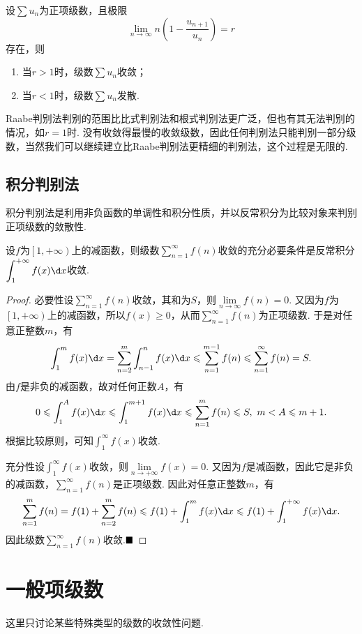 \begin{corollary}[Raabe判别法的极限形式]
	设$\sum u_n$为正项级数，且极限
	$$\lim\limits_{n\to\infty}n\left(1-\frac{u_{n+1}}{u_n}\right)=r$$
	存在，则
	\begin{enumerate}
		\item 当$r>1$时，级数$\sum u_n$收敛；
		\item 当$r<1$时，级数$\sum u_n$发散.
	\end{enumerate}
\end{corollary}
Raabe判别法判别的范围比比式判别法和根式判别法更广泛，但也有其无法判别的情况，如$r=1$时. 没有收敛得最慢的收敛级数，因此任何判别法只能判别一部分级数，当然我们可以继续建立比Raabe判别法更精细的判别法，这个过程是无限的.
\subsection{积分判别法}
积分判别法是利用非负函数的单调性和积分性质，并以反常积分为比较对象来判别正项级数的敛散性.
\begin{theorem}
	设$f$为$\left[1,+\infty\right)$上的减函数，则级数$\displaystyle\sum_{n=1}^{\infty}f(n)$收敛的充分必要条件是反常积分$\displaystyle\int_{1}^{+\infty}f(x)\d x$收敛.
\end{theorem}
\begin{proof}
	{\heiti 必要性}\quad 设$\displaystyle\sum_{n=1}^{\infty}f(n)$收敛，其和为$S$，则$\lim\limits_{n\to\infty}f(n)=0$. 又因为$f$为$\left[1,+\infty\right)$上的减函数，所以$f(x)\geqslant 0$，从而$\displaystyle\sum_{n=1}^{\infty}f(n)$为正项级数. 于是对任意正整数$m$，有
	$$\int_{1}^{m}f(x)\d x=\sum_{n=2}^{m}\int_{n-1}^{n}f(x)\d x\leqslant \sum_{n=1}^{m-1}f(n)\leqslant \sum_{n=1}^{\infty}f(n)=S.$$
	由$f$是非负的减函数，故对任何正数$A$，有
	$$0\leqslant \int_{1}^{A}f(x)\d x\leqslant \int_{1}^{m+1}f(x)\d x\leqslant \sum_{n=1}^{m}f(n)\leqslant S,\ m<A\leqslant m+1.$$
	根据比较原则，可知$\displaystyle\int_{1}^{\infty}f(x)$收敛.
	
	{\heiti 充分性}\quad 设$\displaystyle\int_{1}^{\infty}f(x)$收敛，则$\lim\limits_{n\to +\infty}f(x)=0$. 又因为$f$是减函数，因此它是非负的减函数，$\displaystyle\sum_{n=1}^{\infty}f(n)$是正项级数. 因此对任意正整数$m$，有
	$$\sum_{n=1}^{m}f(n)=f(1)+\sum_{n=2}^{m}f(n)\leqslant f(1)+\int_{1}^{m}f(x)\d x\leqslant f(1)+\int_{1}^{+\infty}f(x)\d x.$$
	因此级数$\displaystyle\sum_{n=1}^{\infty}f(n)$收敛.$\hfill\blacksquare$
\end{proof}
\section{一般项级数}
这里只讨论某些特殊类型的级数的收敛性问题.
